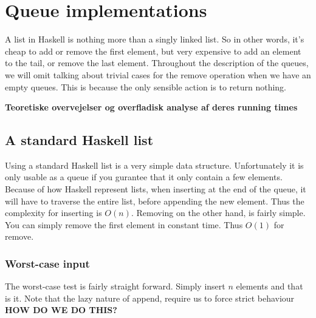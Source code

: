 \section*{Queue implementations}
A list in Haskell is nothing more than a singly linked list. So in other words, it's cheap to add or remove the first element, but very expensive to add an element to the tail, or remove the last element. Throughout the description of the queues, we will omit talking about trivial cases for the remove operation when we have an empty queues. This is because the only sensible action is to return nothing.

\textbf{Teoretiske overvejelser og overfladisk analyse af deres running times}

\subsection*{A standard Haskell list}
Using a standard Haskell list is a very simple data structure. Unfortunately it is only usable as a queue if you gurantee that it only contain a few elements. Because of how Haskell represent lists, when inserting at the end of the queue, it will have to traverse the entire list, before appending the new element. Thus the complexity for inserting is $O(n)$. Removing on the other hand, is fairly simple. You can simply remove the first element in constant time. Thus $O(1)$ for remove.

\subsubsection{Worst-case input}
The worst-case test is fairly straight forward. Simply insert $n$ elements and that is it. Note that the lazy nature of append, require us to force strict behaviour \textbf{HOW DO WE DO THIS?}

